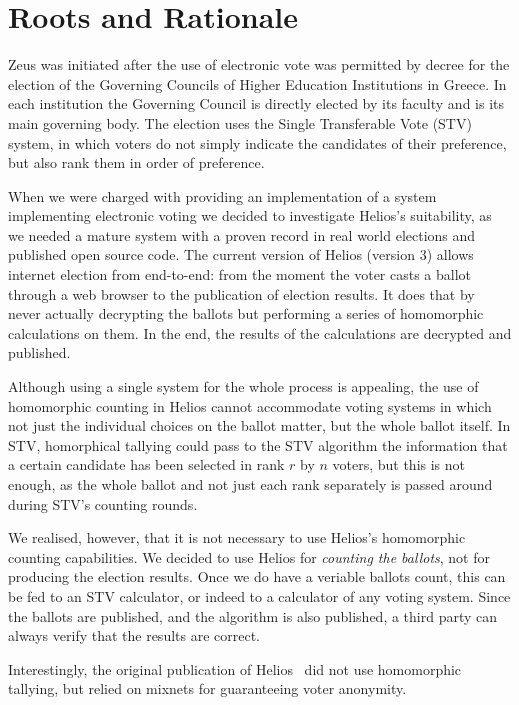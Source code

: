 \documentclass[letterpaper,twocolumn,10pt]{article}
\begin{document}
\section{Roots and Rationale}

Zeus was initiated after the use of electronic vote was permitted by
decree for the election of the Governing Councils of Higher Education
Institutions in Greece. In each institution the Governing Council is
directly elected by its faculty and is its main governing body. The
election uses the Single Transferable Vote (STV) system, in which
voters do not simply indicate the candidates of their preference, but
also rank them in order of preference. 

When we were charged with providing an implementation of a system
implementing electronic voting we decided to investigate Helios's
suitability, as we needed a mature system with a proven record in real
world elections and published open source code. The current version of
Helios (version 3) allows internet election from end-to-end: from the
moment the voter casts a ballot through a web browser to the
publication of election results. It does that by never actually
decrypting the ballots but performing a series of homomorphic
calculations on them. In the end, the results of the calculations are
decrypted and published. 

Although using a single system for the whole process is appealing, the
use of homomorphic counting in Helios cannot accommodate voting
systems in which not just the individual choices on the ballot matter,
but the whole ballot itself. In STV, homorphical tallying could pass
to the STV algorithm the information that a certain candidate has been
selected in rank $r$ by $n$ voters, but this is not enough, as the whole
ballot and not just each rank separately is passed around during STV's
counting rounds.

We realised, however, that it is not necessary to use Helios's
homomorphic counting capabilities. We decided to use Helios for
\emph{counting the ballots}, not for producing the election results.
Once we do have a veriable ballots count, this can be fed to an STV
calculator, or indeed to a calculator of any voting system. Since the
ballots are published, and the algorithm is also published, a third
party can always verify that the results are correct.

Interestingly, the original publication of Helios~\cite{adida:2008}
did not use homomorphic tallying, but relied on mixnets for
guaranteeing voter anonymity. ~\cite{bulens:2011}
\end{document}
